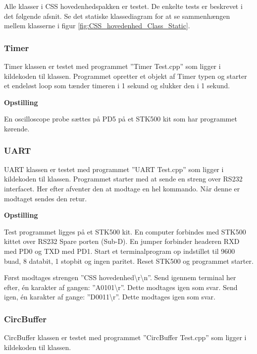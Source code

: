 Alle klasser i CSS hovedenhedspakken er testet. De enkelte tests er beskrevet i det følgende afsnit.
Se det statiske klassediagram for at se sammenhængen mellem klasserne i figur \ref{fig:CSS_hovedenhed_Class_Static}.

\subsubsection{Timer}
Timer klassen er testet med programmet ''Timer Test.cpp'' som ligger i kildekoden til klassen.
Programmet opretter et objekt af Timer typen og starter et endeløst loop som tænder timeren i 1 sekund og slukker den i 1 sekund.

\textbf{Opstilling}

En oscilloscope probe sættes på PD5 på et STK500 kit som har programmet kørende.




\subsubsection{UART}
UART klassen er testet med programmet ''UART Test.cpp'' som ligger i kildekoden til klassen.
Programmet starter med at sende en streng over RS232 interfacet. Her efter afventer den at modtage en hel kommando. Når denne er modtaget sendes den retur.

\textbf{Opstilling}

Test programmet ligges på et STK500 kit.
En computer forbindes med STK500 kittet over RS232 Spare porten (Sub-D).
En jumper forbinder headeren RXD med PD0 og TXD med PD1.
Start et terminalprogram op indstillet til 9600 buad, 8 databit, 1 stopbit og ingen paritet.
Reset STK500 og programmet starter.

Først modtages strengen ''CSS hovedenhed\textbackslash r\textbackslash n''.
Send igennem terminal her efter, én karakter af gangen: ''A0101\textbackslash r''. Dette modtages igen som svar.
Send igen, én karakter af gange: ''D0011\textbackslash r''. Dette modtages igen som svar.

\subsubsection{CircBuffer}
CircBuffer klassen er testet med programmet ''CircBuffer Test.cpp'' som ligger i kildekoden til klassen.

